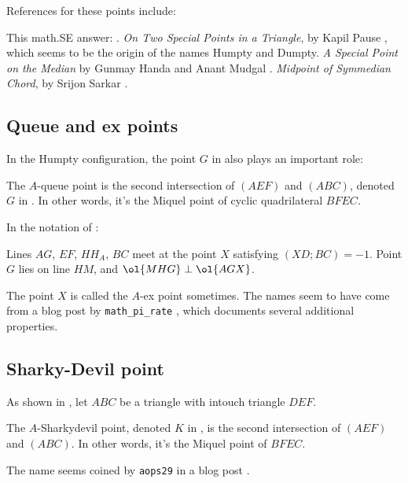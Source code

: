 \documentclass[11pt]{scrartcl}
\begin{document}
References for these points include:
\begin{itemize}
  \ii This math.SE answer: \cite{SE20}.
  \ii \emph{On Two Special Points in a Triangle}, by Kapil Pause \cite{TSP18},
  which seems to be the origin of the names Humpty and Dumpty.
  \ii \emph{A Special Point on the Median} by Gunmay Handa and Anant Mudgal
  \cite{SPM17}.
  \ii \emph{Midpoint of Symmedian Chord}, by Srijon Sarkar \cite{MSC21}.
\end{itemize}

\subsection{Queue and ex points}
In the Humpty configuration, the point $G$ in 
also plays an important role:
\begin{definition}
  The \alert{$A$-queue point} is the second intersection of $(AEF)$ and $(ABC)$,
  denoted $G$ in .
  In other words, it's the Miquel point of cyclic quadrilateral $BFEC$.
\end{definition}
\begin{theorem}
  \label{thm:queue}
  In the notation of :
  \begin{enumerate}
    \ii Lines $AG$, $EF$, $HH_A$, $BC$ meet at the point $X$ satisfying $(XD;BC) = -1$.
    \ii Point $G$ lies on line $HM$, and $\ol{MHG} \perp \ol{AGX}$.
  \end{enumerate}
\end{theorem}
The point $X$ is called the \alert{$A$-ex point} sometimes.
The names seem to have come from a blog post by \texttt{math\_pi\_rate} \cite{EQ18},
which documents several additional properties.

\subsection{Sharky-Devil point}
As shown in ,
let $ABC$ be a triangle with intouch triangle $DEF$.
\begin{definition}
  The \alert{$A$-Sharkydevil point}, denoted $K$ in ,
  is the second intersection of $(AEF)$ and $(ABC)$.
  In other words, it's the Miquel point of $BFEC$.
\end{definition}
The name seems coined by \texttt{aops29} in a blog post \cite{SDP19}.
\end{document}
